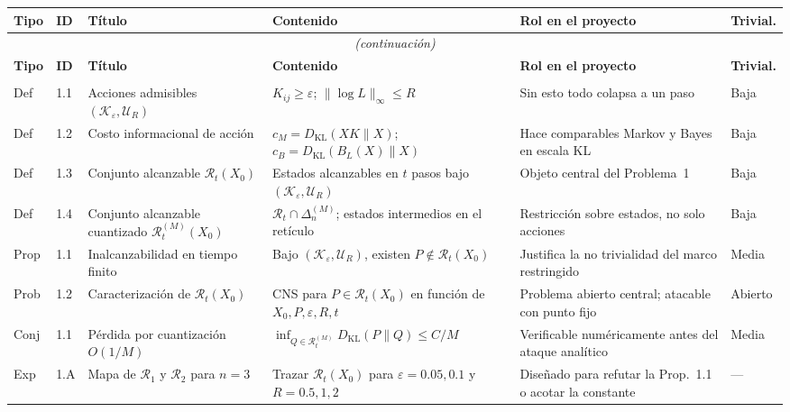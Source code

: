 \documentclass[12pt]{article}
\begin{document}
\noindent\begin{longtable}{@{}p{0.65cm}p{0.65cm}p{3.5cm}p{4.6cm}p{3.6cm}p{1.5cm}@{}}
\toprule
\textbf{Tipo} & \textbf{ID} & \textbf{Título} & \textbf{Contenido} &
\textbf{Rol en el proyecto} & \textbf{Trivial.} \\
\midrule
\endfirsthead
\multicolumn{6}{c}{\textit{(continuación)}} \\
\toprule
\textbf{Tipo} & \textbf{ID} & \textbf{Título} & \textbf{Contenido} &
\textbf{Rol en el proyecto} & \textbf{Trivial.} \\
\midrule
\endhead
\bottomrule
\endlastfoot

\multicolumn{6}{@{}l}{\textbf{Problema 1 --- Alcanzabilidad restringida}} \\[2pt]
\rowcolor{colorDef}
Def & 1.1 & Acciones admisibles $({\mathcal K}_\varepsilon,{\mathcal U}_R)$ &
$K_{ij}\geq\varepsilon$; $\|\log L\|_\infty\leq R$ &
Sin esto todo colapsa a un paso &
\cellcolor{trivBaja} Baja \\
\rowcolor{colorDef}
Def & 1.2 & Costo informacional de acción &
$c_M=D_{\mathrm{KL}}(XK\|X)$; $c_B=D_{\mathrm{KL}}(B_L(X)\|X)$ &
Hace comparables Markov y Bayes en escala KL &
\cellcolor{trivBaja} Baja \\
\rowcolor{colorDef}
Def & 1.3 & Conjunto alcanzable $\mathcal{R}_t(X_0)$ &
Estados alcanzables en $t$ pasos bajo $({\mathcal K}_\varepsilon,{\mathcal U}_R)$ &
Objeto central del Problema~1 &
\cellcolor{trivBaja} Baja \\
\rowcolor{colorDef}
Def & 1.4 & Conjunto alcanzable cuantizado $\mathcal{R}_t^{(M)}(X_0)$ &
$\mathcal{R}_t\cap\Delta_n^{(M)}$; estados intermedios en el retículo &
Restricción sobre estados, no solo acciones &
\cellcolor{trivBaja} Baja \\
\rowcolor{colorProp}
Prop & 1.1 & Inalcanzabilidad en tiempo finito &
Bajo $({\mathcal K}_\varepsilon,{\mathcal U}_R)$, existen $P\notin\mathcal{R}_t(X_0)$ &
Justifica la no trivialidad del marco restringido &
\cellcolor{trivMedia} Media \\
\rowcolor{colorProb}
Prob & 1.2 & Caracterización de $\mathcal{R}_t(X_0)$ &
CNS para $P\in\mathcal{R}_t(X_0)$ en función de $X_0,P,\varepsilon,R,t$ &
Problema abierto central; atacable con punto fijo &
\cellcolor{trivAbierto} Abierto \\
\rowcolor{colorConj}
Conj & 1.1 & Pérdida por cuantización $O(1/M)$ &
$\inf_{Q\in\mathcal{R}_t^{(M)}}D_{\mathrm{KL}}(P\|Q)\leq C/M$ &
Verificable numéricamente antes del ataque analítico &
\cellcolor{trivMedia} Media \\
\rowcolor{colorExp}
Exp & 1.A & Mapa de $\mathcal{R}_1$ y $\mathcal{R}_2$ para $n=3$ &
Trazar $\mathcal{R}_t(X_0)$ para $\varepsilon=0.05,0.1$ y $R=0.5,1,2$ &
Diseñado para refutar la Prop.~1.1 o acotar la constante &
--- \\[4pt]


\end{longtable}
\end{document}
